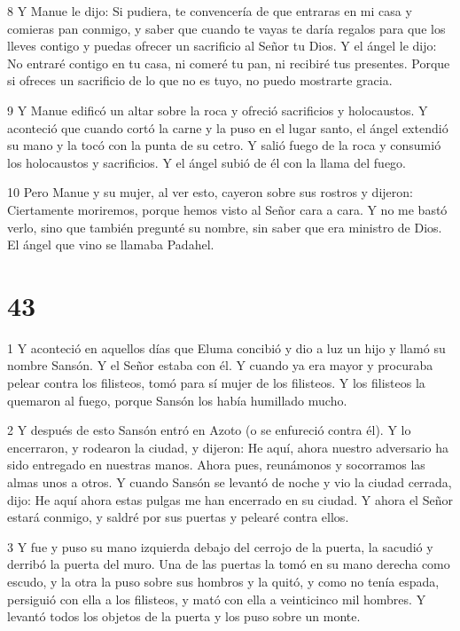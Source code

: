\par 8 Y Manue le dijo: Si pudiera, te convencería de que entraras en mi casa y comieras pan conmigo, y saber que cuando te vayas te daría regalos para que los lleves contigo y puedas ofrecer un sacrificio al Señor tu Dios. Y el ángel le dijo: No entraré contigo en tu casa, ni comeré tu pan, ni recibiré tus presentes. Porque si ofreces un sacrificio de lo que no es tuyo, no puedo mostrarte gracia.

\par 9 Y Manue edificó un altar sobre la roca y ofreció sacrificios y holocaustos. Y aconteció que cuando cortó la carne y la puso en el lugar santo, el ángel extendió su mano y la tocó con la punta de su cetro. Y salió fuego de la roca y consumió los holocaustos y sacrificios. Y el ángel subió de él con la llama del fuego.

\par 10 Pero Manue y su mujer, al ver esto, cayeron sobre sus rostros y dijeron: Ciertamente moriremos, porque hemos visto al Señor cara a cara. Y no me bastó verlo, sino que también pregunté su nombre, sin saber que era ministro de Dios. El ángel que vino se llamaba Padahel.



\chapter{43}

\par 1 Y aconteció en aquellos días que Eluma concibió y dio a luz un hijo y llamó su nombre Sansón. Y el Señor estaba con él. Y cuando ya era mayor y procuraba pelear contra los filisteos, tomó para sí mujer de los filisteos. Y los filisteos la quemaron al fuego, porque Sansón los había humillado mucho.

\par 2 Y después de esto Sansón entró en Azoto (o se enfureció contra él). Y lo encerraron, y rodearon la ciudad, y dijeron: He aquí, ahora nuestro adversario ha sido entregado en nuestras manos. Ahora pues, reunámonos y socorramos las almas unos a otros. Y cuando Sansón se levantó de noche y vio la ciudad cerrada, dijo: He aquí ahora estas pulgas me han encerrado en su ciudad. Y ahora el Señor estará conmigo, y saldré por sus puertas y pelearé contra ellos.

\par 3 Y fue y puso su mano izquierda debajo del cerrojo de la puerta, la sacudió y derribó la puerta del muro. Una de las puertas la tomó en su mano derecha como escudo, y la otra la puso sobre sus hombros y la quitó, y como no tenía espada, persiguió con ella a los filisteos, y mató con ella a veinticinco mil hombres. Y levantó todos los objetos de la puerta y los puso sobre un monte.

